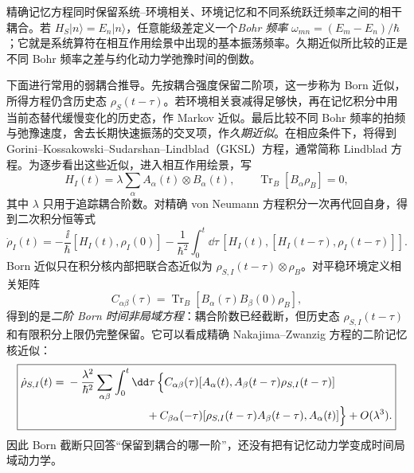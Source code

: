 精确记忆方程同时保留系统--环境相关、环境记忆和不同系统跃迁频率之间的相干耦合。若 $H_S|n\rangle=E_n|n\rangle$，任意能级差定义一个\emph{Bohr 频率} $\omega_{mn}=(E_m-E_n)/\hbar$；它就是系统算符在相互作用绘景中出现的基本振荡频率。久期近似所比较的正是不同 Bohr 频率之差与约化动力学弛豫时间的倒数。

下面进行常用的弱耦合推导。先按耦合强度保留二阶项，这一步称为 Born 近似，所得方程仍含历史态 $\rho_S(t-\tau)$。若环境相关衰减得足够快，再在记忆积分中用当前态替代缓慢变化的历史态，作 Markov 近似。最后比较不同 Bohr 频率的拍频与弛豫速度，舍去长期快速振荡的交叉项，作\emph{久期近似}。在相应条件下，将得到 Gorini--Kossakowski--Sudarshan--Lindblad（GKSL）方程，通常简称 Lindblad 方程。为逐步看出这些近似，进入相互作用绘景，写
\[
H_I(t)=\lambda\sum_{\alpha}A_\alpha(t)\otimes B_\alpha(t),
\qquad
\operatorname{Tr}_B[B_\alpha\rho_B]=0,
\]
其中 $\lambda$ 只用于追踪耦合阶数。对精确 von Neumann 方程积分一次再代回自身，得到二次积分恒等式
\begin{equation}
\boxed{
\dot\rho_I(t)
=-\frac{\ii}{\hbar}[H_I(t),\rho_I(0)]
-\frac1{\hbar^2}\int_0^t\dd\tau\,
[H_I(t),[H_I(t-\tau),\rho_I(t-\tau)]].}
\label{eq:exact_second_order_integral_identity_open_system}
\end{equation}
Born 近似只在积分核内部把联合态近似为 $\rho_{S,I}(t-\tau)\otimes\rho_B$。对平稳环境定义相关矩阵
\[
C_{\alpha\beta}(\tau)
=\operatorname{Tr}_B[B_\alpha(\tau)B_\beta(0)\rho_B],
\]
得到的是\emph{二阶 Born 时间非局域方程}：耦合阶数已经截断，但历史态 $\rho_{S,I}(t-\tau)$ 和有限积分上限仍完整保留。它可以看成精确 Nakajima--Zwanzig 方程的二阶记忆核近似：
\begin{equation}
\boxed{
\begin{aligned}
\dot\rho_{S,I}(t)
={}&-\frac{\lambda^2}{\hbar^2}
\sum_{\alpha\beta}\int_0^t\dd\tau\,
\Big\{
C_{\alpha\beta}(\tau)
[A_\alpha(t),A_\beta(t-\tau)\rho_{S,I}(t-\tau)]\\
&\hspace{25mm}+C_{\beta\alpha}(-\tau)
[\rho_{S,I}(t-\tau)A_\beta(t-\tau),A_\alpha(t)]
\Big\}+O(\lambda^3).
\end{aligned}}
\label{eq:born_nonmarkov_redfield_kernel}
\end{equation}
因此 Born 截断只回答“保留到耦合的哪一阶”，还没有把有记忆动力学变成时间局域动力学。

